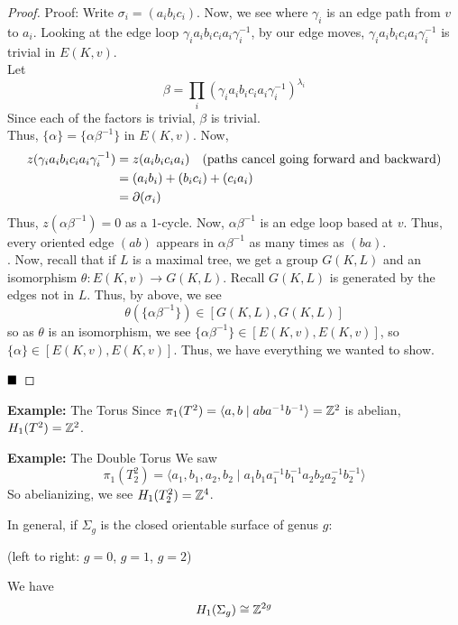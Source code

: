 \begin{proof}{Proof:}
    Write $\sigma_i = (a_ib_ic_i)$. Now, we see
    where $\gamma_i$ is an edge path from $v$ to $a_i$. Looking at the edge loop $\gamma_ia_ib_ic_ia_i\gamma_i^{-1}$, by our edge moves, $\gamma_ia_ib_ic_ia_i\gamma_i^{-1}$ is trivial in $E(K, v)$.\\

    Let
    \[ \beta = \prod_i (\gamma_ia_ib_ic_ia_i\gamma_i^{-1})^{\lambda_i} \]
    Since each of the factors is trivial, $\beta$ is trivial.\\

    Thus, $\{\alpha\} = \{\alpha\beta^{-1}\}$ in $E(K, v)$. Now,
    \begin{align*}
        z(\gamma_ia_ib_ic_ia_i\gamma_i^{-1}) &= z(a_ib_ic_ia_i) \quad \tt{(paths cancel going forward and backward)}\\
        &= (a_ib_i) + (b_ic_i) + (c_ia_i)\\
        &= \partial(\sigma_i)
    \end{align*}
    Thus, $z(\alpha\beta^{-1}) = 0$ as a $1$-cycle.
    Now, $\alpha\beta^{-1}$ is an edge loop based at $v$. Thus, every oriented edge $(ab)$ appears in $\alpha\beta^{-1}$ as many times as $(ba)$.\\
.
    Now, recall that if $L$ is a maximal tree, we get a group $G(K, L)$ and an isomorphism $\theta : E(K, v) \to G(K, L)$. Recall $G(K, L)$ is generated by the edges not in $L$. Thus, by above, we see
    \[ \theta(\{\alpha\beta^{-1}\}) \in [G(K, L), G(K, L)] \]
    so as $\theta$ is an isomorphism, we see $\{\alpha\beta^{-1}\} \in [E(K, v), E(K, v)]$, so $\{\alpha\} \in [E(K, v), E(K, v)]$. Thus, we have everything we wanted to show.

    $\qed$
\end{proof}

\begin{example}{\textbf{Example:} The Torus}
    Since $\pi_1(T^2) = \langle a, b \mid aba^{-1}b^{-1} \rangle = \Z^2$ is abelian, $H_1(T^2) = \Z^2$.
\end{example}

\begin{example}{\textbf{Example:} The Double Torus}
    We saw
    \[ \pi_1(T_2^2) = \langle a_1, b_1, a_2, b_2 \mid a_1b_1a_1^{-1}b_1^{-1}a_2b_2a_2^{-1}b_2^{-1} \rangle \]
    So abelianizing, we see $H_1(T_2^2) = \Z^4$.
\end{example}

In general, if $\Sigma_g$ is the closed orientable surface of genus $g$:
\begin{center}
    (left to right: $g = 0$, $g = 1$, $g = 2$)
\end{center}
We have
\[ H_1(\Sigma_g) \cong \Z^{2g} \]

